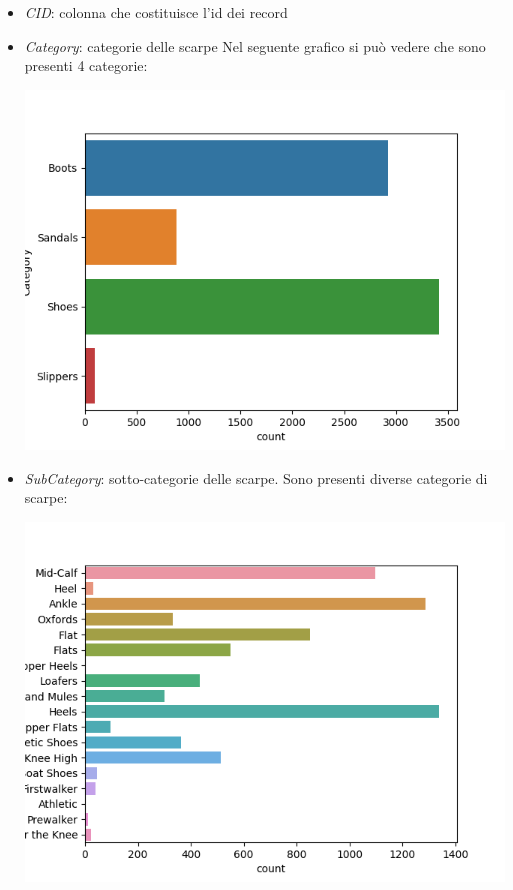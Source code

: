 \documentclass[a4paper, 11pt, oneside]{report}
\begin{document}
                \begin{itemize}
                    \item \textit{CID}: colonna che costituisce l'id dei record
                    \item \textit{Category}: categorie delle scarpe
                    Nel seguente grafico si può vedere che sono presenti 4 categorie:
                    \begin{center}
                        \includegraphics[scale=0.4]{CategoryShoes}
                    \end{center}
                    \item \textit{SubCategory}: sotto-categorie delle scarpe.
                    Sono presenti diverse categorie di scarpe:
                    \begin{center}
                        \includegraphics[scale=0.2]{SubCategoryShoes}

\end{center}
\end{itemize}
\end{document}
